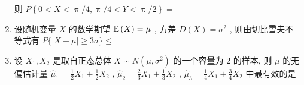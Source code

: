 \begin{enumerate}
	则 $P\left\{0<X<\uppi/4,\uppi/4<Y<\uppi/2\right\}=$\underline{\hspace{8pc}}
	
	\item 设随机变量 $X$ 的数学期望 $\mathbb{E}\,(X)=\mu$ , 方差 $D(X)=\sigma^2$ , 则由切比雪夫不等式有 $P\{|X-\mu|\geq3\sigma\}\leq$\underline{\hspace{8pc}}
	
	\item 设 $X_1,X_2$ 是取自正态总体 $X\sim N\left(\mu,\sigma^2\right)$ 的一个容量为 $2$ 的样本, 则 $\mu$ 的无偏估计量 $\hat\mu_1=\frac{1}{2}X_1+\frac{1}{2}X_2$ , $\hat\mu_2=\frac{2}{3}X_1+\frac{1}{3}X_2$ , $\hat\mu_3=\frac{1}{4}X_1+\frac{3}{4}X_2$ 中最有效的是\underline{\hspace{8pc}}
\end{enumerate}

